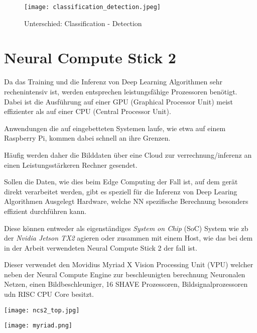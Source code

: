 \begin{figure}[H]
    \centering
    \label{fig:class_vs_det}
    \texttt{[image: classification\_detection.jpeg]}
    \caption{Unterschied: Classification - Detection}
\end{figure}




\section{Neural Compute Stick 2}\label{ncs2}

Da das Training und die Inferenz von Deep Learning Algorithmen
 sehr rechenintensiv ist, werden entsprechen leistungsfähige 
Prozessoren benötigt. Dabei ist die Ausführung auf einer GPU 
(Graphical Processor Unit) meist effizienter als auf einer 
CPU (Central Processor Unit).

Anwendungen die auf eingebetteten Systemen laufe, wie etwa 
auf einem Raspberry Pi, kommen dabei schnell an ihre 
Grenzen.

Häufig werden daher die Bilddaten über eine Cloud zur 
verrechnung/inferenz an einen Leistungsstärkeren 
Rechner gesendet.

Sollen die Daten, wie dies beim Edge Computing der Fall ist, 
auf dem gerät direkt verarbeitet werden, gibt es speziell 
für die Inferenz von Deep Learing Algorithmen Ausgelegt 
Hardware, welche NN spezifische Berechnung besonders 
effizient durchführen kann.

Diese können entweder als eigenständiges \textit{System on Chip}
(SoC) System wie zb der \textit{Nvidia Jetson TX2} agieren oder 
zusammen mit einem Host, wie das bei dem in der Arbeit verwendeten 
Neural Compute Stick 2 der fall ist.

Dieser verwendet den Movidius Myriad X Vision Processing Unit (VPU)
welcher neben der Neural Compute Engine zur beschleunigten berechnung 
Neuronalen Netzen, einen Bildbeschleuniger, 16 SHAVE Prozessoren, 
Bildsignalprozessoren udn RISC CPU Core besitzt.
\cite{haussermannFunktionUndEffizienz}
\\[1cm]
\begin{minipage}{0.4\textwidth}
    \centering
    \label{fig:ncs2}
    \texttt{[image: ncs2\_top.jpg]}
\end{minipage}
\begin{minipage}{0.6\textwidth}
    \centering
    \label{fig:myriad}
    \texttt{[image: myriad.png]}
\end{minipage}


